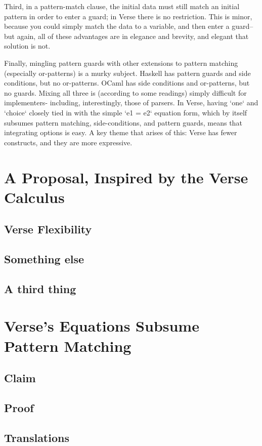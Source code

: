 \documentclass{article}
\begin{document}
Third, in a pattern-match clause, the initial data must still match an initial
pattern in order to enter a guard; in Verse there is no restriction. This is
minor, because you could simply match the data to a variable, and then enter a
guard-- but again, all of these advantages are in elegance and brevity, and
elegant that solution is not. 

Finally, mingling pattern guards with other extensions to pattern matching
(especially or-patterns) is a murky subject. Haskell has pattern guards and side
conditions, but no or-patterns. OCaml has side conditions and or-patterns, but
no guards. Mixing all three is (according to some readings) simply difficult for
implementers- including, interestingly, those of parsers. In Verse, having `one`
and `choice` closely tied in with the simple `e1 = e2` equation form, which by
itself subsumes pattern matching, side-conditions, and pattern guards, means
that integrating options is easy. A key theme that arises of this: Verse has
fewer constructs, and they are more expressive.  

\section{A Proposal, Inspired by the Verse Calculus}

\subsection{Verse Flexibility}
\subsection{Something else}
\subsection{A third thing}

\section{Verse's Equations Subsume Pattern Matching}

\subsection{Claim}
\subsection{Proof}
\subsection{Translations}
\end{document}

